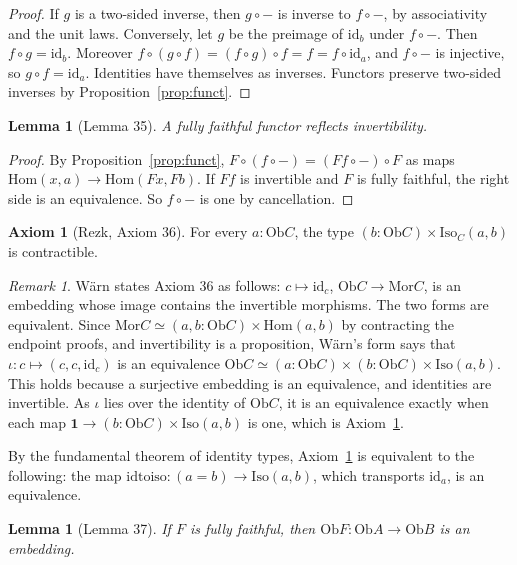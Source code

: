 \documentclass[11pt]{amsart}
\numberwithin{equation}{section}
\newtheorem{lemma}[theorem]{Lemma}
\theoremstyle{definition}
\newtheorem{axiom}[theorem]{Axiom}
\theoremstyle{remark}
\newtheorem{remark}[theorem]{Remark}
\newcommand{\Ob}{\mathrm{Ob}}
\newcommand{\Mor}{\mathrm{Mor}}
\newcommand{\Hom}{\mathrm{Hom}}
\newcommand{\Iso}{\mathrm{Iso}}
\newcommand{\id}{\mathrm{id}}
\newcommand{\one}{\mathbf{1}}
\begin{document}
\begin{proof}
If $g$ is a two-sided inverse, then $g\circ-$ is inverse to $f\circ-$,
by associativity and the unit laws. Conversely, let $g$ be the preimage
of $\id_b$ under $f\circ-$. Then $f\circ g=\id_b$. Moreover
$f\circ(g\circ f)=(f\circ g)\circ f=f=f\circ\id_a$, and $f\circ-$ is
injective, so $g\circ f=\id_a$. Identities have themselves as inverses.
Functors preserve two-sided inverses by Proposition~\ref{prop:funct}.
\end{proof}

\begin{lemma}[Lemma 35]
A fully faithful functor reflects invertibility.
\end{lemma}

\begin{proof}
By Proposition~\ref{prop:funct}, $F\circ(f\circ-)=(Ff\circ-)\circ F$ as
maps $\Hom(x,a)\to\Hom(Fx,Fb)$. If $Ff$ is invertible and $F$ is fully
faithful, the right side is an equivalence. So $f\circ-$ is one by
cancellation.
\end{proof}

\begin{axiom}[Rezk, Axiom 36]\label{ax:rezk}
For every $a:\Ob C$, the type $(b:\Ob C)\times\Iso_C(a,b)$ is
contractible.
\end{axiom}

\begin{remark}\label{rem:rezk}
W\"arn states Axiom 36 as follows: $c\mapsto\id_c$, $\Ob C\to\Mor C$, is
an embedding whose image contains the invertible morphisms. The two
forms are equivalent. Since $\Mor C\simeq(a,b:\Ob C)\times\Hom(a,b)$ by
contracting the endpoint proofs, and invertibility is a proposition,
W\"arn's form says that $\iota:c\mapsto(c,c,\id_c)$ is an equivalence
$\Ob C\simeq(a:\Ob C)\times(b:\Ob C)\times\Iso(a,b)$. This holds
because a surjective embedding is an equivalence, and identities are
invertible. As $\iota$ lies over the identity of $\Ob C$, it is an
equivalence exactly when each map $\one\to(b:\Ob C)\times\Iso(a,b)$ is
one, which is Axiom~\ref{ax:rezk}.
\end{remark}

By the fundamental theorem of identity types, Axiom~\ref{ax:rezk} is
equivalent to the following: the map $\mathrm{idtoiso}:(a=b)\to
\Iso(a,b)$, which transports $\id_a$, is an equivalence.

\begin{lemma}[Lemma 37]
If $F$ is fully faithful, then $\Ob F:\Ob A\to\Ob B$ is an embedding.
\end{lemma}
\end{document}
